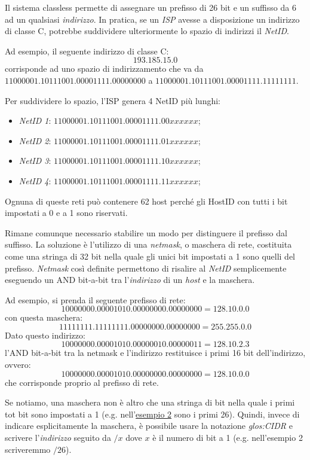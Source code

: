 \noindent
Il sistema classless permette di assegnare un prefisso di 26 bit e un suffisso
da 6 ad un qualsiasi \emph{indirizzo}.  In pratica, se un \emph{ISP} avesse
a disposizione un indirizzo di classe C, potrebbe suddividere ulteriormente lo
spazio di indirizzi  il \emph{NetID}.

\begin{eg}
Ad esempio, il seguente indirizzo di classe C:
\[193.185.15.0\]
corrisponde ad uno spazio di indirizzamento che va da
$11000001.10111001.00001111.00000000$ a
$11000001.10111001.00001111.11111111$.

Per suddividere lo spazio, l'ISP genera 4 NetID più lunghi:
\begin{itemize}
    \item \emph{NetID 1}: $11000001.10111001.00001111.00xxxxxx$;
    \item \emph{NetID 2}: $11000001.10111001.00001111.01xxxxxx$;
    \item \emph{NetID 3}: $11000001.10111001.00001111.10xxxxxx$;
    \item \emph{NetID 4}: $11000001.10111001.00001111.11xxxxxx$;
\end{itemize}
Ognuna di queste reti può contenere 62 host perché gli HostID
con tutti i bit impostati a 0 e a 1 sono riservati.
\end{eg}\noindent
Rimane comunque necessario stabilire un modo per distinguere il prefisso
dal suffisso. La soluzione è l'utilizzo di una \emph{netmask}, o maschera di rete,
costituita come una stringa di 32 bit nella quale gli unici bit impostati a 1
sono quelli del prefisso. \emph{Netmask} così definite permettono di risalire
al \emph{NetID} semplicemente eseguendo un AND bit-a-bit tra l'\emph{indirizzo}
di un \emph{host} e la maschera.

\begin{eg}
    Ad esempio, si prenda il seguente prefisso di rete:
    \[10000000.00001010.00000000.00000000 = 128.10.0.0\]
    con questa maschera:
    \[11111111.11111111.00000000.00000000 = 255.255.0.0\]
    Dato questo indirizzo:
    \[10000000.00001010.00000010.00000011 = 128.10.2.3\]
    l'AND bit-a-bit tra la netmask e l'indirizzo restituisce i primi 16 bit
    dell'indirizzo, ovvero:
    \[10000000.00001010.00000000.00000000 = 128.10.0.0\]
    che corrisponde proprio al prefisso di rete.
\end{eg}\noindent
Se notiamo, una maschera non è altro che una stringa di bit nella quale i primi
tot bit sono impostati a 1 (e.g. nell'\hyperref[eg:2]{esempio 2} sono i primi 26).
Quindi, invece di indicare esplicitamente la maschera, è possibile usare la
notazione \emph{\gls{glos:CIDR}} e scrivere l'\emph{indirizzo} seguito da $/x$
dove $x$ è il numero di bit a 1 (e.g. nell'esempio 2 scriveremmo $/26$).

